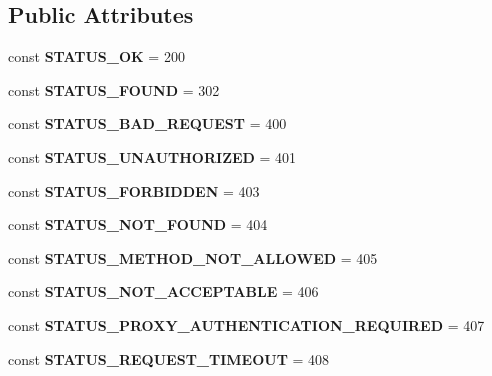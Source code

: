 \subsection*{Public Attributes}
\begin{DoxyCompactItemize}
\item 
\hypertarget{classResponse_a2729ba728b63452c40630c8016ac8884}{
const {\bfseries STATUS\_\-OK} = 200}
\label{classResponse_a2729ba728b63452c40630c8016ac8884}

\item 
\hypertarget{classResponse_ad5d1d151760f26ba720c56adca2b59a8}{
const {\bfseries STATUS\_\-FOUND} = 302}
\label{classResponse_ad5d1d151760f26ba720c56adca2b59a8}

\item 
\hypertarget{classResponse_a4fab3a7be0243185e0b677df3c1e4a60}{
const {\bfseries STATUS\_\-BAD\_\-REQUEST} = 400}
\label{classResponse_a4fab3a7be0243185e0b677df3c1e4a60}

\item 
\hypertarget{classResponse_a3e2b7bf7fb3a9f3a3625e7fb1c3bd8ff}{
const {\bfseries STATUS\_\-UNAUTHORIZED} = 401}
\label{classResponse_a3e2b7bf7fb3a9f3a3625e7fb1c3bd8ff}

\item 
\hypertarget{classResponse_a261ac4174f54994700df546bdd676031}{
const {\bfseries STATUS\_\-FORBIDDEN} = 403}
\label{classResponse_a261ac4174f54994700df546bdd676031}

\item 
\hypertarget{classResponse_a8944f4f3d9f46a1431ae92686037e2b1}{
const {\bfseries STATUS\_\-NOT\_\-FOUND} = 404}
\label{classResponse_a8944f4f3d9f46a1431ae92686037e2b1}

\item 
\hypertarget{classResponse_a32e524f1d5704f27b3b7e69b59b4287d}{
const {\bfseries STATUS\_\-METHOD\_\-NOT\_\-ALLOWED} = 405}
\label{classResponse_a32e524f1d5704f27b3b7e69b59b4287d}

\item 
\hypertarget{classResponse_a6140fd5274d1915a9cbffe2ca8c931eb}{
const {\bfseries STATUS\_\-NOT\_\-ACCEPTABLE} = 406}
\label{classResponse_a6140fd5274d1915a9cbffe2ca8c931eb}

\item 
\hypertarget{classResponse_a8d718687987817f822d2dad6d715a1a0}{
const {\bfseries STATUS\_\-PROXY\_\-AUTHENTICATION\_\-REQUIRED} = 407}
\label{classResponse_a8d718687987817f822d2dad6d715a1a0}

\item 
\hypertarget{classResponse_a9048b0c192e7309727e281510773adf6}{
const {\bfseries STATUS\_\-REQUEST\_\-TIMEOUT} = 408}
\label{classResponse_a9048b0c192e7309727e281510773adf6}


\end{DoxyCompactItemize}
